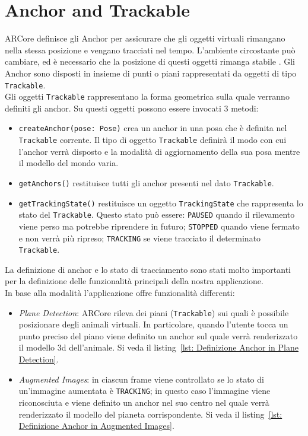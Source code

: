 \documentclass[crop=false, class=book]{standalone}
\begin{document}
		
	\chapter{Anchor and Trackable}
	\label{cap:anchor}
	
		ARCore definisce gli Anchor per assicurare che gli oggetti virtuali rimangano nella stessa posizione e vengano tracciati nel tempo. L'ambiente circostante può cambiare, ed è necessario che la posizione di questi oggetti
		rimanga stabile \cite{gumgumcu2019arcore}. Gli Anchor sono disposti in insieme di punti o piani rappresentati da oggetti di tipo \verb|Trackable|.\\
		Gli oggetti \verb|Trackable| rappresentano la forma geometrica sulla quale verranno definiti gli anchor.
		Su questi oggetti possono essere invocati 3 metodi:
		\begin{itemize}
			\item \verb|createAnchor(pose: Pose)| crea un anchor in una posa che è definita nel \verb|Trackable| corrente. Il tipo di oggetto \verb|Trackable| definirà il modo con cui l'anchor verrà disposto e la modalità di aggiornamento della sua posa mentre il modello del mondo varia.
			\item \verb|getAnchors()| restituisce tutti gli anchor presenti nel dato \verb|Trackable|.
			\item \verb|getTrackingState()| restituisce un oggetto \verb|TrackingState| che rappresenta lo stato del \verb|Trackable|. Questo stato può essere: \verb|PAUSED| quando il rilevamento viene perso ma potrebbe riprendere in futuro; \verb|STOPPED| quando viene fermato e non verrà più ripreso; \verb|TRACKING| se viene tracciato il determinato \verb|Trackable|.
		\end{itemize}
	
		\noindent
		La definizione di anchor e lo stato di tracciamento sono stati molto importanti per la definizione delle funzionalità principali della nostra applicazione.\\
	 	In base alla modalità l'applicazione offre funzionalità differenti:
		
	 	\begin{itemize}
	 		\item \emph{Plane Detection}: ARCore rileva dei piani (\verb|Trackable|) sui quali è possibile posizionare degli animali virtuali. In particolare, quando l'utente tocca un punto preciso del piano viene definito un anchor sul quale verrà renderizzato il modello 3d dell'animale. Si veda il listing~\vref{lst: Definizione Anchor in Plane Detection}.
	 	
	 		\item \emph{Augmented Images}: in ciascun frame viene controllato se lo stato di un'immagine aumentata è \verb|TRACKING|; in questo caso l'immagine viene riconosciuta e viene definito un anchor nel suo centro nel quale verrà renderizzato il modello del pianeta corrispondente. Si veda il listing~\vref{lst: Definizione Anchor in Augmented Images}.
	 	\end{itemize}
	
\end{document}
